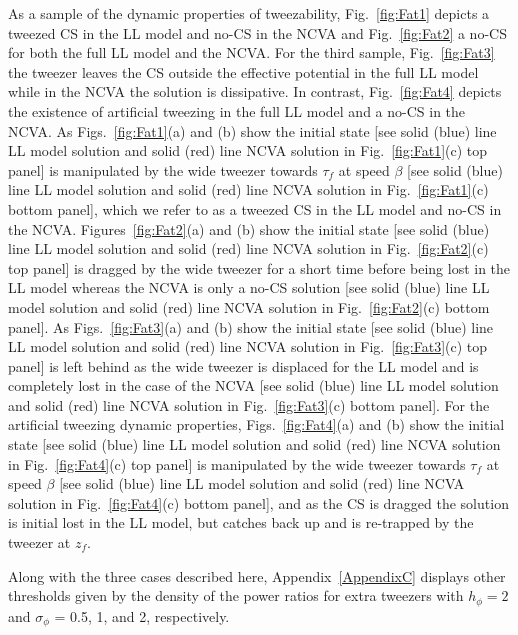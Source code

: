 As a sample of the dynamic properties of tweezability, Fig.~\ref{fig:Fat1} depicts a tweezed CS in the LL model and no-CS in the NCVA and Fig.~\ref{fig:Fat2} a no-CS for both the full LL model and the NCVA.  For the third sample, Fig.~\ref{fig:Fat3} the tweezer leaves the CS outside the effective potential in the full LL model while in the NCVA the solution is dissipative.  In contrast, Fig.~\ref{fig:Fat4} depicts the existence of artificial tweezing in the full LL model and a no-CS in the NCVA.  As Figs.~\ref{fig:Fat1}(a) and (b) show the initial state [see solid (blue) line LL model solution and solid (red) line NCVA solution in Fig.~\ref{fig:Fat1}(c) top panel] is manipulated by the wide tweezer towards $\tau_f$ at speed $\beta$ [see solid (blue) line LL model solution and solid (red) line NCVA solution in Fig.~\ref{fig:Fat1}(c) bottom panel], which we refer to as a tweezed CS in the LL model and no-CS in the NCVA.  Figures~\ref{fig:Fat2}(a) and (b) show the initial state [see solid (blue) line LL model solution and solid (red) line NCVA solution in Fig.~\ref{fig:Fat2}(c) top panel] is dragged by the wide tweezer for a short time before being lost in the LL model whereas the NCVA is only a no-CS solution [see solid (blue) line LL model solution  and solid (red) line NCVA solution in Fig.~\ref{fig:Fat2}(c) bottom panel].  As Figs.~\ref{fig:Fat3}(a) and (b) show the initial state [see solid (blue) line LL model solution and solid (red) line NCVA solution in Fig.~\ref{fig:Fat3}(c) top panel] is left behind as the wide tweezer is displaced for the LL model and is completely lost in the case of the NCVA  [see solid (blue) line LL model solution  and solid (red) line NCVA solution in Fig.~\ref{fig:Fat3}(c) bottom panel].  For the artificial tweezing dynamic properties, Figs.~\ref{fig:Fat4}(a) and (b) show the initial state [see solid (blue) line LL model solution and solid (red) line NCVA solution in Fig.~\ref{fig:Fat4}(c) top panel] is manipulated by the wide tweezer towards $\tau_f$ at speed $\beta$ [see solid (blue) line LL model solution and solid (red) line NCVA solution in Fig.~\ref{fig:Fat4}(c) bottom panel], and as the CS is dragged the solution is initial lost in the LL model, but catches back up and is re-trapped by the tweezer at $z_f$. 

Along with the three cases described here, Appendix~\ref{AppendixC} displays other thresholds given by the density of the power ratios for extra tweezers with $h_\phi =2$ and $\sigma_\phi$ = 0.5, 1, and 2, respectively.

